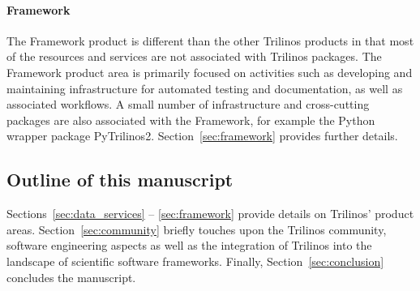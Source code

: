 \paragraph{Framework} The Framework product is different than the other Trilinos products in that most of the resources and services are not associated with Trilinos packages. The Framework product area is primarily focused on activities such as developing and maintaining infrastructure for automated testing and documentation, as well as associated workflows. A small number of infrastructure and cross-cutting packages are also associated with the Framework, for example the Python wrapper package PyTrilinos2. Section~\ref{sec:framework} provides further details.

\subsection{Outline of this manuscript}

Sections~\ref{sec:data_services} -- \ref{sec:framework} provide details on Trilinos' product areas.
Section~\ref{sec:community} briefly touches upon the Trilinos community, software engineering aspects as well as the integration of Trilinos into the landscape of scientific software frameworks.
Finally, Section~\ref{sec:conclusion} concludes the manuscript.
